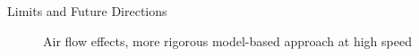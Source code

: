 \begin{frame}{Limits and Future Directions}
	\begin{figure}[ht]
        \begin{minipage}[t]{0.46\linewidth}
            \centering
            Air flow effects, more rigorous model-based approach at high speed
        \end{minipage}
        \hspace{0.5cm}
        \begin{minipage}[t]{0.46\linewidth}

\end{minipage}
\end{figure}
\end{frame}

